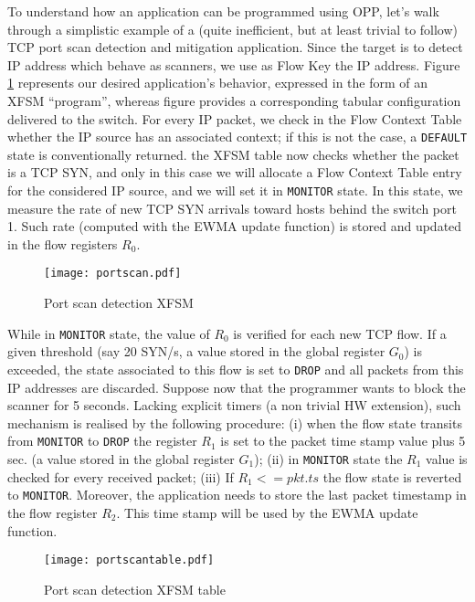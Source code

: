 \documentclass{sig-alternate}
\begin{document}
To understand how an application can be programmed using OPP, let's walk through a simplistic example of a (quite inefficient, but at least trivial to follow) TCP port scan detection and mitigation application. Since the target is to detect IP address which behave as scanners, we use as Flow Key the IP address. Figure \ref{F:portscan} represents our desired application's behavior, expressed in the form of an XFSM ``program'', whereas figure \label{F:pscan_table} provides a corresponding tabular configuration delivered to the switch. For every IP packet, we check in the Flow Context Table whether the IP source has an associated context; if this is not the case, a \texttt{DEFAULT} state is conventionally returned. the XFSM table now checks whether the packet is a TCP SYN, and only in this case we will allocate a Flow Context Table entry for the considered IP source, and we will set it in \texttt{MONITOR} state. In this state, we measure the rate of new TCP SYN arrivals toward hosts behind the switch port 1. Such rate (computed with the EWMA update function) is stored and updated in the flow registers $R_0$. 

\begin{figure}[t]
\centering
   \texttt{[image: portscan.pdf]}
      	  \vspace{-2.2em}
\caption{Port scan detection XFSM}
\label{F:portscan}
\end{figure}

While in \texttt{MONITOR} state, the value of $R_0$ is verified for each new TCP flow. If a given threshold (say 20 SYN/s, a value stored in the global register $G_0$) is exceeded, the state associated to this flow is set to \texttt{DROP} and all packets from this IP addresses are discarded. Suppose now that the programmer wants to block the scanner for 5 seconds. Lacking explicit timers (a non trivial HW extension), such mechanism is realised by the following procedure:  (i) when the flow state transits from \texttt{MONITOR} to \texttt{DROP} the register $R_1$ is set to the packet time stamp value plus 5 sec. (a value stored in the global register $G_1$); (ii) in \texttt{MONITOR} state the $R_1$ value is checked for every received packet; (iii) If $R_1 <= pkt.ts$ the flow state is reverted to \texttt{MONITOR}. Moreover, the application needs to store the last packet timestamp in the flow register $R_2$. This time stamp will be used by the EWMA update function. 

\begin{figure}[t]
\centering
   \texttt{[image: portscantable.pdf]}
         	  \vspace{-2em}
\caption{Port scan detection XFSM table}
      	  \vspace{-1.5em}
\label{F:pscan_table}
\end{figure}
\end{document}
